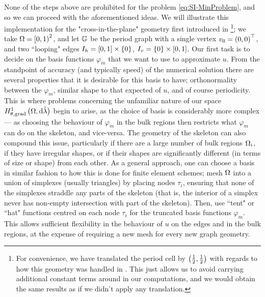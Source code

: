 None of the steps above are prohibited for the problem \eqref{eq:SI-MinProblem}, and so we can proceed with the aforementioned ideas.
We will illustrate this implementation for the "cross-in-the-plane" geometry first introduced in \footnote{For convenience, we have translated the period cell by $\left( \frac{1}{2},\frac{1}{2} \right)$ with regards to how this geometry was handled in . This just allows us to avoid carrying additional constant terms around in our computations, and we would obtain the same results as if we didn't apply any translation.}; we take $\Omega=\left[0,1\right)^2$, and let $\mathbb{G}$ be the period graph with a single vertex $v_0=\left( 0,0 \right)^\top$, and two ``looping" edges $I_h = \left[ 0,1 \right]\times\left\{ 0 \right\}$, $I_v=\left\{ 0 \right\}\times\left[ 0,1 \right]$.
Our first task is to decide on the basis functions $\varphi_m$ that we want to use to approximate $u$.
From the standpoint of accuracy (and typically speed) of the numerical solution there are several properties that it is desirable for this basis to have; orthonormality between the $\varphi_m$, similar shape to that expected of $u$, and of course periodicity.
This is where problems concerning the unfamiliar nature of our space $H^1_{\theta, \mathrm{grad}}\left( \Omega, \mathrm{d}\tilde{\lambda} \right)$ begin to arise, as the choice of basis is considerably more complex --- as choosing the behaviour of $\varphi_m$ in the bulk regions then restricts what $\varphi_m$ can do on the skeleton, and vice-versa. 
The geometry of the skeleton can also compound this issue, particularly if there are a large number of bulk regions $\Omega_i$, if they have irregular shapes, or if their shapes are significantly different (in terms of size or shape) from each other.
As a general approach, one can choose a basis in similar fashion to how this is done for finite element schemes; mesh $\Omega$ into a union of simplexes (usually triangles) by placing nodes $\tau_i$, ensuring that none of the simplexes straddle any parts of the skeleton (that is, the interior of a simplex never has non-empty intersection with part of the skeleton).
Then, use ``tent" or ``hat" functions centred on each node $\tau_i$ for the truncated basis functions $\varphi_m$.
This allows sufficient flexibility in the behaviour of $u$ on the edges and in the bulk regions, at the expense of requiring a new mesh for every new graph geometry.

